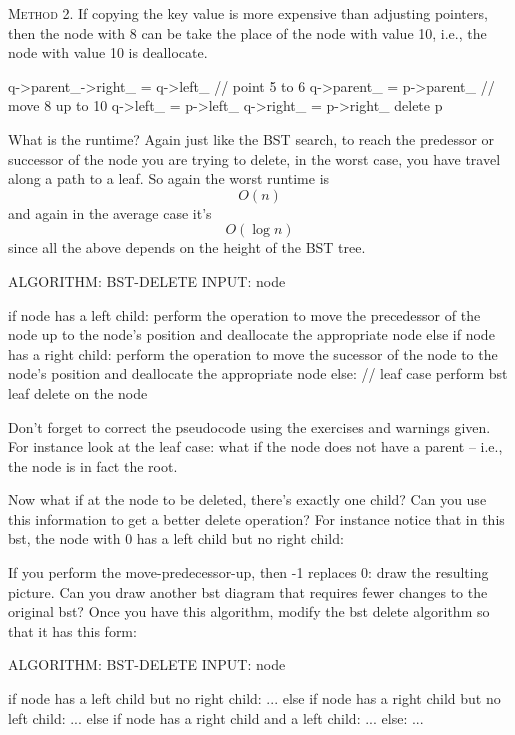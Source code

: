 \textsc{Method 2}.
If copying the key value is more expensive than adjusting pointers,
then the node with 8 can be take the place of the node with value 10, i.e.,
the node with value 10 is deallocate.


\begin{console}
q->parent_->right_ = q->left_ // point 5 to 6
q->parent_ = p->parent_       // move 8 up to 10 
q->left_ = p->left_
q->right_ = p->right_
delete p
\end{console}

What is the runtime?
Again just like the BST search,
to reach the predessor or successor of the node you are trying to
delete, in the worst case, you have
travel along a path to a leaf.
So again the worst runtime is
\[
O(n)
\]
and again in the average case it's
\[
O(\log n)
\]
since all the above depends on the height of the BST tree.

\begin{console}
ALGORITHM: BST-DELETE
INPUT: node

if node has a left child:
    perform the operation to move the precedessor
    of the node up to the node's position
    and deallocate the appropriate node
else if node has a right child:
    perform the operation to move the sucessor
    of the node to the node's position
    and deallocate the appropriate node
else: // leaf case
    perform bst leaf delete on the node
\end{console}

Don't forget to correct the pseudocode using the exercises and warnings
given.
For instance look at the leaf case: what if the node
does not have a parent -- i.e., the node is in fact the root.


\begin{ex}
Now what if at the node to be deleted, there's exactly one child?
Can you use this information to get a better delete
operation?
For instance notice that in this bst, the node with 0 has a left
child but no right child:

If you perform the move-predecessor-up, then -1 replaces 0: draw the resulting
picture.
Can you draw another bst diagram that requires fewer changes to the original
bst?
Once you have this algorithm, modify the bst delete algorithm so that
it has this form:
\begin{console}
ALGORITHM: BST-DELETE
INPUT: node

if node has a left child but no right child:
    ...
else if node has a right child but no left child:
    ...
else if node has a right child and a left child:
    ...
else:
    ...
  \end{console}
\end{ex}


